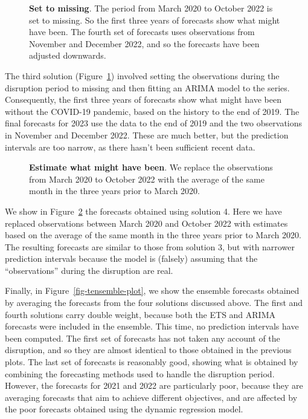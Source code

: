 \documentclass[
  11pt,
  a4paper,
]{article}
\begin{document}
\begin{figure}[!b]


\caption{\label{fig-tsol3-plot}\textbf{Set to missing}. The period from
March 2020 to October 2022 is set to missing. So the first three years
of forecasts show what might have been. The fourth set of forecasts uses
observations from November and December 2022, and so the forecasts have
been adjusted downwards.}

\end{figure}%

The third solution (Figure~\ref{fig-tsol3-plot}) involved setting the
observations during the disruption period to missing and then fitting an
ARIMA model to the series. Consequently, the first three years of
forecasts show what might have been without the COVID-19 pandemic, based
on the history to the end of 2019. The final forecasts for 2023 use the
data to the end of 2019 and the two observations in November and
December 2022. These are much better, but the prediction intervals are
too narrow, as there hasn't been sufficient recent data.

\begin{figure}[!b]


\caption{\label{fig-tsol4-plot}\textbf{Estimate what might have been}.
We replace the observations from March 2020 to October 2022 with the
average of the same month in the three years prior to March 2020.}

\end{figure}%

We show in Figure~\ref{fig-tsol4-plot} the forecasts obtained using
solution 4. Here we have replaced observations between March 2020 and
October 2022 with estimates based on the average of the same month in
the three years prior to March 2020. The resulting forecasts are similar
to those from solution 3, but with narrower prediction intervals because
the model is (falsely) assuming that the ``observations'' during the
disruption are real.

Finally, in Figure~\ref{fig-tensemble-plot}, we show the ensemble
forecasts obtained by averaging the forecasts from the four solutions
discussed above. The first and fourth solutions carry double weight,
because both the ETS and ARIMA forecasts were included in the ensemble.
This time, no prediction intervals have been computed. The first set of
forecasts has not taken any account of the disruption, and so they are
almost identical to those obtained in the previous plots. The last set
of forecasts is reasonably good, showing what is obtained by combining
the forecasting methods used to handle the disruption period. However,
the forecasts for 2021 and 2022 are particularly poor, because they are
averaging forecasts that aim to achieve different objectives, and are
affected by the poor forecasts obtained using the dynamic regression
model.
\end{document}
